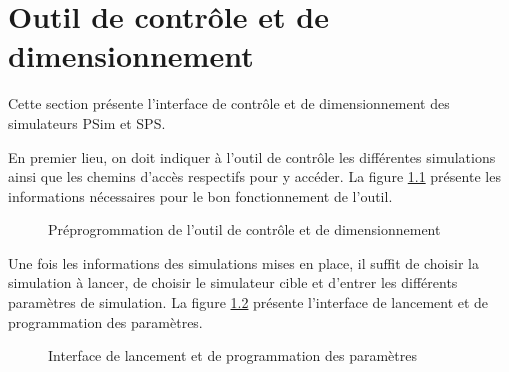 \chapter{Outil de contrôle et de dimensionnement}
Cette section présente l'interface de contrôle et de dimensionnement des simulateurs PSim et SPS.

En premier lieu, on doit indiquer à l'outil de contrôle les différentes simulations ainsi que les chemins d'accès respectifs pour y accéder. La figure \ref{outil1} présente les informations nécessaires pour le bon fonctionnement de l'outil.

 \begin{figure}[htb]
 \centering
 \caption{Préprogrommation de l'outil de contrôle et de dimensionnement}
 \label{outil1}
 \end{figure}

Une fois les informations des simulations mises en place, il suffit de choisir la simulation à lancer, de choisir le simulateur cible et d'entrer les différents paramètres de simulation. La figure \ref{outil2} présente l'interface de lancement et de programmation des paramètres.

 \begin{figure}[htb]
 \centering
 \caption{Interface de lancement et de programmation des paramètres}
 \label{outil2}
 \end{figure}

